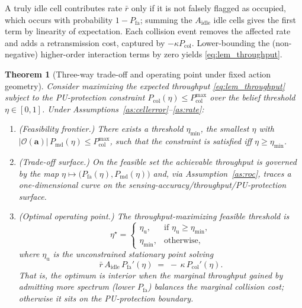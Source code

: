 \documentclass[journal]{IEEEtran}
\newtheorem{theorem}{Theorem}
\newcommand{\Pmd}{P_{\mathrm{md}}}         %
\newcommand{\Pfa}{P_{\mathrm{fa}}}         %
\newcommand{\thr}{\eta}                    %
\newcommand{\act}{\bm{a}}                  %
\newcommand{\Pcol}{P_{\mathrm{col}}}       %
\newcommand{\Pcolmax}{P_{\mathrm{col}}^{\max}} %
\begin{document}
\begin{IEEEproof}
A truly idle cell contributes rate $\bar{r}$ only if it is not falsely
flagged as occupied, which occurs with probability $1-\Pfa$; summing the
$A_{\mathrm{idle}}$ idle cells gives the first term by linearity of
expectation. Each collision event removes the affected rate and adds a
retransmission cost, captured by $-\kappa\Pcol$. Lower-bounding the
(non-negative) higher-order interaction terms by zero yields
\eqref{eq:lem_throughput}.
\end{IEEEproof}

\begin{theorem}[Three-way trade-off and operating point under fixed action geometry]
\label{thm:tradeoff}
Consider maximizing the expected throughput \eqref{eq:lem_throughput} subject
to the PU-protection constraint $\Pcol(\thr)\le\Pcolmax$ over the belief
threshold $\thr\in[0,1]$. Under Assumptions~\ref{as:cellerror}--\ref{as:rate}:
\begin{enumerate}
\item[(i)] \emph{(Feasibility frontier.)} There exists a threshold
$\thr_{\min}$, the smallest $\thr$ with
$|\mathcal{O}(\act)|\,\Pmd(\thr)\le\Pcolmax$, such that the constraint is
satisfied iff $\thr\ge\thr_{\min}$.
\item[(ii)] \emph{(Trade-off surface.)} On the feasible set the achievable
throughput is governed by the map
$\thr\mapsto\bigl(\Pfa(\thr),\Pmd(\thr)\bigr)$ and, via
Assumption~\ref{as:roc}, traces a one-dimensional curve on the
sensing-accuracy/throughput/PU-protection surface.
\item[(iii)] \emph{(Optimal operating point.)} The throughput-maximizing
feasible threshold is
\begin{equation}
\thr^{\star}=
\begin{cases}
\thr_{\mathrm{u}}, & \text{if } \thr_{\mathrm{u}}\ge\thr_{\min},\\[2pt]
\thr_{\min}, & \text{otherwise,}
\end{cases}
\label{eq:thmA_opt}
\end{equation}
where $\thr_{\mathrm{u}}$ is the unconstrained stationary point solving
\begin{equation}
\bar{r}\,A_{\mathrm{idle}}\,\Pfa'(\thr)
\;=\;-\,\kappa\,\Pcol'(\thr).
\label{eq:thmA_foc}
\end{equation}
That is, the optimum is interior when the marginal throughput gained by
admitting more spectrum (lower $\Pfa$) balances the marginal collision cost;
otherwise it sits on the PU-protection boundary.
\end{enumerate}
\end{theorem}
\end{document}

